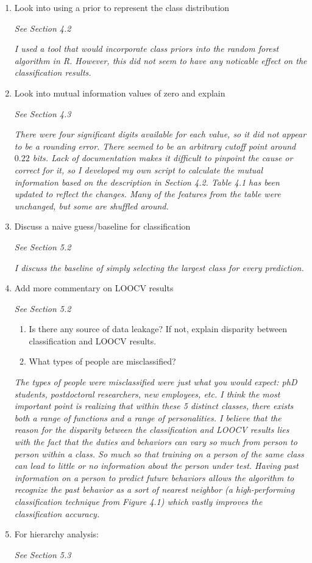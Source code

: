 \documentclass[12pt]{report}
\begin{document}
\begin{enumerate}
    \item Look into using a prior to represent the class distribution
    \par \textit{See Section 4.2}
    \par \textit{I used a tool that would incorporate class priors into the random forest algorithm in R.  However, this did not seem to have any noticable effect on the classification results.}
	\item Look into mutual information values of zero and explain 
	\par \textit{See Section 4.3}
    	\par \textit{There were four significant digits available for each value, so it did not appear to be a rounding error.
    		  There seemed to be an arbitrary cutoff point around $0.22$ bits.
    		  Lack of documentation makes it difficult to pinpoint the cause or correct for it, so I developed my own script to calculate the mutual information based on the description in Section 4.2.
    		  Table 4.1 has been updated to reflect the changes.
    		  Many of the features from the table were unchanged, but some are shuffled around.}



    \item Discuss a naive guess/baseline for classification
    \par \textit{See Section 5.2}    
    \par \textit{I discuss the baseline of simply selecting the largest class for every prediction.}    
	\item Add more commentary on LOOCV results
	\par \textit{See Section 5.2}
    \begin{enumerate}
   	    \item Is there any source of data leakage? If not, explain disparity between classification and LOOCV results.
		\item What types of people are misclassified?


    \end{enumerate}
    		\par \textit{The types of people were misclassified were just what you would expect: phD students, postdoctoral researchers, new employees, etc.
    			I think the most important point is realizing that within these 5 distinct classes, there exists both a range of functions and a range of personalities.
    			I believe that the reason for the disparity between the classification and LOOCV results lies with the fact that the duties and behaviors can vary so much from person to person within a class.
    			So much so that training on a person of the same class can lead to little or no information about the person under test.
    			Having past information on a person to predict future behaviors allows the algorithm to recognize the past behavior as a sort of nearest neighbor (a high-performing classification technique from Figure 4.1) which vastly improves the classification accuracy.}
	\item For hierarchy analysis:
	\par \textit{See Section 5.3}
	

\end{enumerate}
\end{document}

